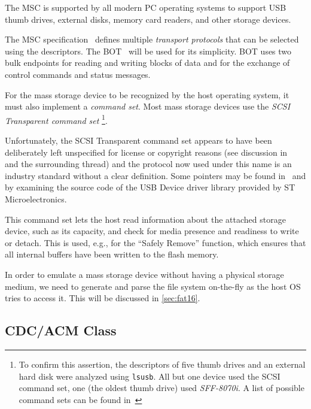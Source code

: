 The \gls{MSC} is supported by all modern \gls{PC} operating systems to support \gls{USB} thumb drives, external disks, memory card readers, and other storage devices.


The \gls{MSC} specification~\cite{usbif-msco} defines multiple \textit{transport protocols} that can be selected using the descriptors. The \gls{BOT}~\cite{usbif-bot} will be used for its simplicity. \gls{BOT} uses two bulk endpoints for reading and writing blocks of data and for the exchange of control commands and status messages.

For the mass storage device to be recognized by the host operating system, it must also implement a \textit{command set}. Most mass storage devices use the \textit{\gls{SCSI} Transparent command set}
\footnote{To confirm this assertion, the descriptors of five thumb drives and an external hard disk were analyzed using \verb|lsusb|. All but one device used the SCSI command set, one (the oldest thumb drive) used \textit{SFF-8070i}. A list of possible command sets can be found in~\cite{usbif-msco}}.

Unfortunately, the \gls{SCSI} Transparent command set appears to have been deliberately left unspecified for license or copyright reasons (see discussion in~\cite{usb-tscsi-wtf} and the surrounding thread) and the protocol now used under this name is an industry standard without a clear definition. Some pointers may be found in~\cite{usb-tscsi} and by examining the source code of the USB Device driver library provided by ST Microelectronics.

This command set lets the host read information about the attached storage device, such as its capacity, and check for media presence and readiness to write or detach. This is used, e.g., for the ``Safely Remove'' function, which ensures that all internal buffers have been written to the flash memory.

In order to emulate a mass storage device without having a physical storage medium, we need to generate and parse the file system on-the-fly as the host \gls{OS} tries to access it. This will be discussed in \cref{sec:fat16}.

\subsection{CDC/ACM Class} \label{sec:cdc-acm}

